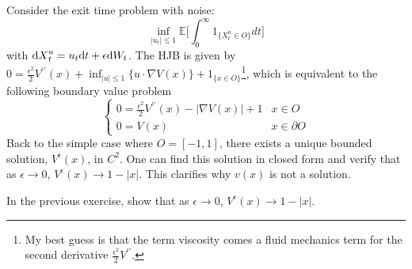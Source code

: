 \documentclass[11pt]{book}
\newcommand{\dt}{\text{\normalfont d}t}
\newcommand{\dX}{\text{\normalfont d}X}
\newcommand{\dW}{\text{\normalfont d}W}
\begin{document}
\begin{eg}
Consider the exit time problem with noise:
    \begin{equation}
        \inf_{|u_t|\le 1}\mathbb{E}\Big[\int_0^\infty 1_{\{X^u_t\in O\}} dt\Big]
    \end{equation}
with    ${\dX}_t^u=u_t{\dt}+\epsilon\dW_t$.
The HJB is given by 
$0=\frac{\epsilon^2}{2}V^{\prime\prime}(x)+\inf_{|u|\le 1}\{u\cdot \nabla V(x)\}+1_{\{x\in O\}}$\footnote{My best guess is that the term viscosity comes a fluid mechanics term for the second derivative $\frac{\epsilon^2}{2}V^{\prime\prime}$.}, which is equivalent to the following boundary value problem
   \begin{equation}
   \begin{cases}
       0=\frac{\epsilon^2}{2}V^{\prime\prime}(x)-|\nabla V(x)|+1& x\in O\\
       0=V(x)& x\in\partial O
   \end{cases}
   \end{equation}
Back to the simple case where $O=[-1,1]$, there exists a unique bounded solution, $V^{\epsilon}(x)$, in $C^2$. One can find this solution in closed form and verify that as $\epsilon\to 0$, $V^{\epsilon}(x)\to 1-|x|$. This clarifies why $v(x)$ is not a solution.
\end{eg}
\begin{ex}
     In the previous exercise, show that as $\epsilon\to 0$, $V^{\epsilon}(x)\to 1-|x|$.  
\end{ex}
\end{document}
